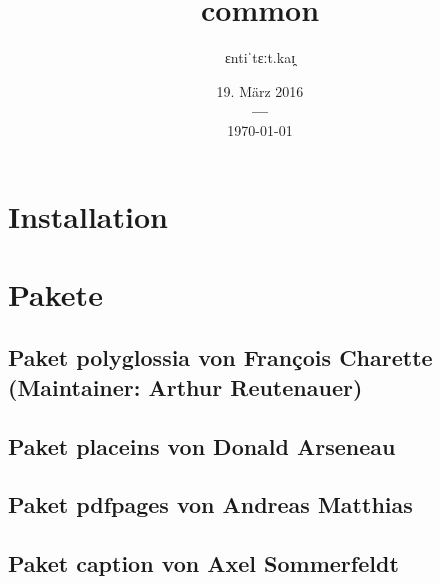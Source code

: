 \documentclass[a4paper,12pt]{article}
\title{\fontspec{Times New Roman}common}
\title{\fontspec{Times New Roman}\common}
\author{\fontspec{Times New Roman}ɛntiˈtɛːt.kaɪ̯}
\date{%
			{\fontspec{Times New Roman}19. März 2016} \\
			{\bf---} \\[0.2\baselineskip]
			\fontspec{Times New Roman}\today}
\begin{document}
		\listoftodos

		


		\maketitle



		

		\tableofcontents  %
		\tableofcontents    %
		\listoffigures      %
		\listoftables       %
		\lstlistoflistings  %



		\chapter{Installation}
		\chapter{Pakete}
			\section{Paket polyglossia von François Charette (Maintainer: Arthur
				Reutenauer)}
				
			\section{Paket placeins von Donald Arseneau}
				
			\section{Paket pdfpages von Andreas Matthias}
				
			\section{Paket caption von Axel Sommerfeldt}
				
\end{document}
